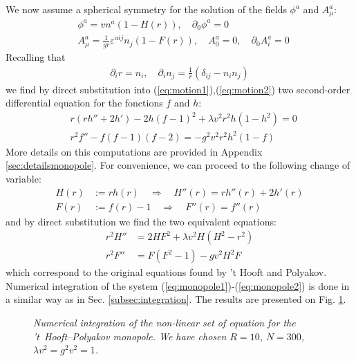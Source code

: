 We now assume a spherical symmetry for the solution of the fields
$\phi^a$ and $A_{\mu}^a$:
\begin{equation}
  \begin{aligned}
    &\phi^a = v n^a\left(1-H(r)\right),\quad\partial_0\phi^a = 0\\
    &A_\mu^a = \frac{1}{gr}\varepsilon^{aij}n_j\left(1-F(r)\right),\quad A_0^a = 0,\quad \partial_0A_i^a = 0
  \end{aligned}\label{eq:ansatz}
\end{equation}
Recalling that
\begin{align}
  \partial_i r = n_i, \quad \partial_i n_j = \frac{1}{r}\left(\delta_{ij}-n_in_j\right)
\end{align}
we find by direct substitution into
(\ref{eq:motion1}),(\ref{eq:motion2}) two second-order differential
equation for the fonctions $f$ and $h$:
\begin{align}
  &r(rh''+2h')-2h(f-1)^2+\lambda v^2r^2h(1-h^2) = 0\label{eq:monopole1}\\
  &r^2f''-f(f-1)(f-2) = -g^2v^2r^2h^2(1-f)\label{eq:monopole2}
\end{align}
More details on this computations are provided in Appendix
\ref{sec:detailsmonopole}. For convenience, we can proceed to the
following change of variable:
\begin{align}
  H(r) &:= rh(r)\quad\Rightarrow\quad H''(r) = rh''(r)+2h'(r)\\
  F(r) &:= f(r)-1\quad\Rightarrow\quad F''(r) = f''(r)
\end{align}
and by direct substitution we find the two equivalent equations:
\begin{align}
  r^2H'' &= 2HF^2+\lambda v^2H(H^2-r^2)\\
  r^2F'' &= F(F^2-1)-gv^2H^2 F
\end{align}
which correspond to the original equations found by 't Hooft and
Polyakov. Numerical integration of the system
(\ref{eq:monopole1})-(\ref{eq:monopole2}) is done in a similar way as
in Sec. \ref{subsec:integration}. The results are presented on
Fig. \ref{fig:monopole}.
\begin{figure}
  
  \caption{\em Numerical integration of the non-linear set of equation for
    the 't~Hooft--Polyakov monopole. We have chosen $R=10$, $N=300$,
    $\lambda v^2 = g^2v^2 = 1$.}
  \label{fig:monopole}
\end{figure}

